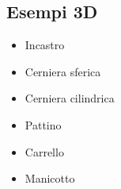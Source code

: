 \documentclass[letterpaper,10pt,english]{jupyterBook}
\begin{document}
\subsection{Esempi 3D}
\label{\detokenize{ch/actions-reactions:esempi-3d}}\begin{itemize}
\item {} 
\sphinxAtStartPar
Incastro

\item {} 
\sphinxAtStartPar
Cerniera sferica

\item {} 
\sphinxAtStartPar
Cerniera cilindrica

\item {} 
\sphinxAtStartPar
Pattino

\item {} 
\sphinxAtStartPar
Carrello

\item {} 
\sphinxAtStartPar
Manicotto

\end{itemize}

\sphinxstepscope
\end{document}
